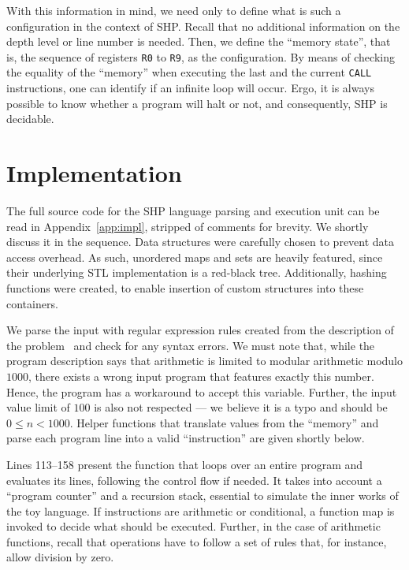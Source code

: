 \documentclass[12pt]{article}
\begin{document}
With this information in mind, we need only to define what is such a configuration in the context of SHP. Recall that no additional information on the depth level or line number is needed. Then, we define the ``memory state'', that is, the sequence of registers \texttt{R0} to \texttt{R9}, as the configuration. By means of checking the equality of the ``memory'' when executing the last and the current \texttt{CALL} instructions, one can identify if an infinite loop will occur. Ergo, it is always possible to know whether a program will halt or not, and consequently, SHP is decidable.

\section{Implementation}\label{sec:imp}

The full source code for the SHP language parsing and execution unit can be read in Appendix~\ref{app:impl}, stripped of comments for brevity. We shortly discuss it in the sequence. Data structures were carefully chosen to prevent data access overhead. As such, unordered maps and sets are heavily featured, since their underlying STL implementation is a red-black tree. Additionally, hashing functions were created, to enable insertion of custom structures into these containers. 

We parse the input with regular expression rules created from the description of the problem~\cite{Demasi:misc:2013:may} and check for any syntax errors. We must note that, while the program description says that arithmetic is limited to modular arithmetic modulo $1000$, there exists a wrong input program that features exactly this number. Hence, the program has a workaround to accept this variable. Further, the input value limit of $100$ is also not respected --- we believe it is a typo and should be $0 \leq n < 1000$. Helper functions that translate values from the ``memory'' and parse each program line into a valid ``instruction'' are given shortly below.

Lines 113--158 present the function that loops over an entire program and evaluates its lines, following the control flow if needed. It takes into account a ``program counter'' and a recursion stack, essential to simulate the inner works of the toy language. If instructions are arithmetic or conditional, a function map is invoked to decide what should be executed. Further, in the case of arithmetic functions, recall that operations have to follow a set of rules that, for instance, allow division by zero.
\end{document}

